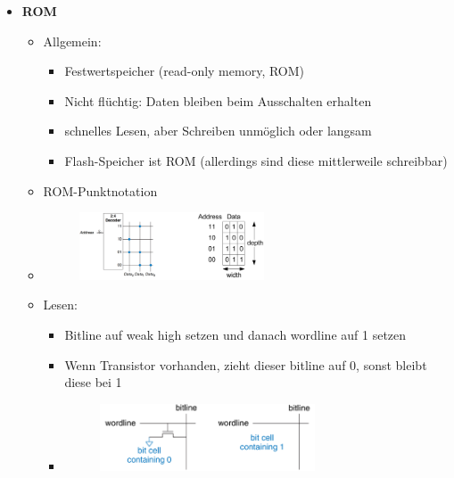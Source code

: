 \documentclass[11pt,a4paper]{article}
\begin{document}
\begin{itemize}
\item \textbf{ROM}
	\begin{itemize}
	\item Allgemein:
		\begin{itemize}
		\item Festwertspeicher (read-only memory, ROM)
		\item Nicht flüchtig: Daten bleiben beim Ausschalten erhalten
		\item schnelles Lesen, aber Schreiben unmöglich oder langsam
		\item Flash-Speicher ist ROM (allerdings sind diese mittlerweile schreibbar)
		\end{itemize}
	\item ROM-Punktnotation
	\item[]
			\begin{figure}[H]
			\begin{center}
			\includegraphics[height=2cm]{rompunkt}
			\end{center}
			\end{figure}
	\item Lesen:
		\begin{itemize}
		\item Bitline auf weak high setzen und danach wordline auf 1 setzen
		\item Wenn Transistor vorhanden, zieht dieser bitline auf 0, sonst bleibt diese bei 1
		\item[]
			\begin{figure}[H]
			\begin{center}
			\includegraphics[height=2cm]{romread}
			\end{center}
			\end{figure}
		\end{itemize}
		
\pagebreak		
		

\end{itemize}
\end{itemize}
\end{document}
